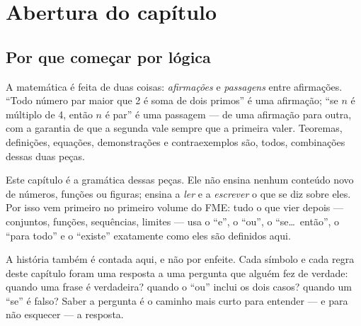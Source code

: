 \section*{Abertura do capítulo}

\subsection*{Por que começar por lógica}
A matemática é feita de duas coisas: \emph{afirmações} e \emph{passagens} entre afirmações. \enquote{Todo número par maior que 2 é soma de dois primos} é uma afirmação; \enquote{se $n$ é múltiplo de 4, então $n$ é par} é uma passagem — de uma afirmação para outra, com a garantia de que a segunda vale sempre que a primeira valer. Teoremas, definições, equações, demonstrações e contraexemplos são, todos, combinações dessas duas peças.

Este capítulo é a gramática dessas peças. Ele não ensina nenhum conteúdo novo de números, funções ou figuras; ensina a \emph{ler} e a \emph{escrever} o que se diz sobre eles. Por isso vem primeiro no primeiro volume do FME: tudo o que vier depois — conjuntos, funções, sequências, limites — usa o \enquote{e}, o \enquote{ou}, o \enquote{se\ldots\ então}, o \enquote{para todo} e o \enquote{existe} exatamente como eles são definidos aqui.

A história também é contada aqui, e não por enfeite. Cada símbolo e cada regra deste capítulo foram uma resposta a uma pergunta que alguém fez de verdade: quando uma frase é verdadeira? quando o \enquote{ou} inclui os dois casos? quando um \enquote{se} é falso? Saber a pergunta é o caminho mais curto para entender — e para não esquecer — a resposta.

